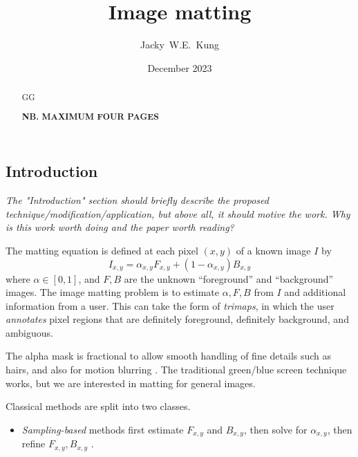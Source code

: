 \documentclass{article}
\title{Image matting}
\author{Jacky~W.E.~Kung}
\date{December 2023}
\begin{document}
\maketitle
\begin{abstract}
    GG

    \textbf{NB. MAXIMUM FOUR PAGES}
\end{abstract}
\begin{multicols}{2}[]




\section{Introduction}
\emph{The "Introduction" section should briefly describe the proposed technique/modification/application, but above all, it should motive the work. Why is this work worth doing and the paper worth reading?}


The matting equation is defined at each pixel $(x,y)$ of a known image $I$ by
$$I_{x,y} = \alpha_{x,y} F_{x,y}  + (1-\alpha_{x,y}) B_{x,y}$$
where $\alpha\in[0,1]$, and $F,B$ are the unknown ``foreground'' and ``background'' images. The image matting problem is to estimate $\alpha,F,B$ from $I$ and additional information from a user. This can take the form of \emph{trimaps}, in which the user \emph{annotates} pixel regions that are definitely foreground, definitely background, and ambiguous.

The alpha mask is fractional to allow smooth handling of fine details such as hairs, and also for motion blurring \cite{bayesian-matting}. The traditional green/blue screen technique works, but we are interested in matting for general images.

Classical methods are split into two classes.
\begin{itemize}
    \item \emph{Sampling-based} methods first estimate $F_{x,y}$ and $B_{x,y}$, then solve for $\alpha_{x,y}$, then refine $F_{x,y},B_{x,y}$ \cite{dim-paper}.


\end{itemize}
\end{multicols}
\end{document}
